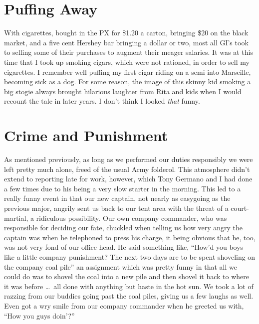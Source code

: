 \documentclass[../m3y]{subfiles}
\begin{document}
\section{Puffing Away}
With cigarettes, bought in the PX for \$1.20 a carton, bringing \$20 on the black market, and a five cent Hershey bar bringing a dollar or two, most all GI's took to selling some of their purchases to augment their meager salaries. It was at this time that I took up smoking cigars, which were not rationed, in order to sell my cigarettes. I remember well puffing my first cigar riding on a semi into Marseille, becoming sick as a dog. For some reason, the image of this skinny kid smoking a big stogie always brought hilarious laughter from Rita and kids when I would recount the tale in later years. I don't think I looked \emph{that} funny.

\section{Crime and Punishment}
As mentioned previously, as long as we performed our duties responsibly we were left pretty much alone, freed of the usual Army folderol. This atmosphere didn't extend to reporting late for work, however, which Tony Germano and I had done a few times due to his being a very slow starter in the morning. This led to a really funny event in that our new captain, not nearly as easygoing as the previous major, angrily sent us back to our tent area with the threat of a court-martial, a ridiculous possibility. Our own company commander, who was responsible for deciding our fate, chuckled when telling us how very angry the captain was when he telephoned to press his charge, it being obvious that he, too, was not very fond of our office head. He said something like, ``How'd you boys like a little company punishment? The next two days are to be spent shoveling on the company coal pile'' an assignment which was pretty funny in that all we could do was to shovel the coal into a new pile and then shovel it back to where it was before \ldots\ all done with anything but haste in the hot sun. We took a lot of razzing from our buddies going past the coal piles, giving us a few laughs as well. Even got a wry smile from our company commander when he greeted us with, ``How you guys doin'?''
\end{document}
